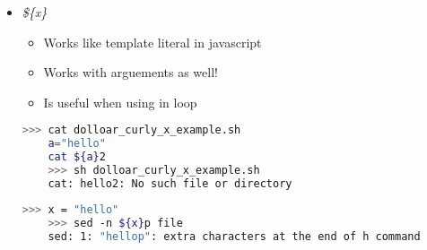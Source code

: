 \documentclass[12pt]{article}
\begin{document}
\begin{itemize}
    \item \textit{\$\{x\}}
    \begin{itemize}
    \item Works like template literal in javascript
    \item Works with arguements as well!
    \item Is useful when using in loop
    \end{itemize}

    \begin{lstlisting}[language=bash]
    >>> cat dolloar_curly_x_example.sh
    a="hello"
    cat ${a}2
    >>> sh dolloar_curly_x_example.sh
    cat: hello2: No such file or directory
    \end{lstlisting}
    \begin{lstlisting}[language=bash]
    >>> x = "hello"
    >>> sed -n ${x}p file
    sed: 1: "hellop": extra characters at the end of h command
    \end{lstlisting}
\end{itemize}
\end{document}
